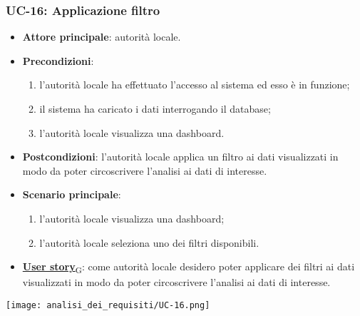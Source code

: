 \subsubsection{UC-16: Applicazione filtro}
\begin{itemize}
	\item \textbf{Attore principale}: autorità locale.
	\item \textbf{Precondizioni}:
	      \begin{enumerate}
		      \item l'autorità locale ha effettuato l'accesso al sistema ed esso è in funzione;
		      \item il sistema ha caricato i dati interrogando il database;
		      \item l'autorità locale visualizza una dashboard.
	      \end{enumerate}
	\item \textbf{Postcondizioni}: l'autorità locale applica un filtro ai dati visualizzati in modo da poter circoscrivere l'analisi ai dati di interesse.
	\item \textbf{Scenario principale}:
	      \begin{enumerate}
		      \item l'autorità locale visualizza una dashboard;
		      \item l'autorità locale seleziona uno dei filtri disponibili.
	      \end{enumerate}
	\item \href{https://7last.github.io/docs/pb/documentazione-interna/glossario\#user-story}{\textbf{User story}\textsubscript{G}}:
	      come autorità locale desidero poter applicare dei filtri ai dati visualizzati in modo da poter circoscrivere l'analisi ai dati di interesse.
\end{itemize}
\begin{center}
	\texttt{[image: analisi\_dei\_requisiti/UC-16.png]}
\end{center}

